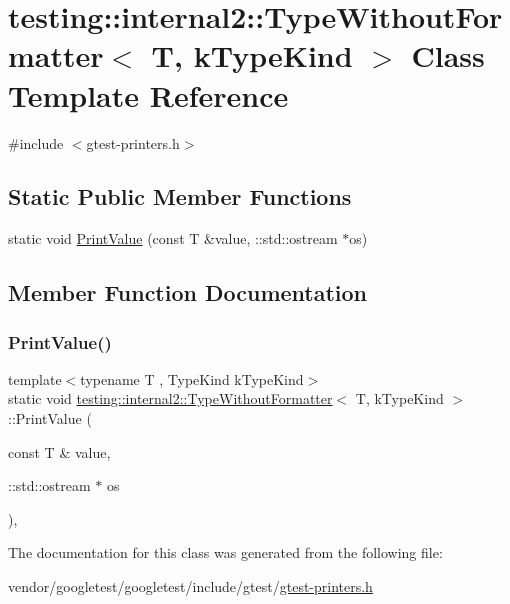 \hypertarget{classtesting_1_1internal2_1_1_type_without_formatter}{}\section{testing\+:\+:internal2\+:\+:Type\+Without\+Formatter$<$ T, k\+Type\+Kind $>$ Class Template Reference}
\label{classtesting_1_1internal2_1_1_type_without_formatter}


{\ttfamily \#include $<$gtest-\/printers.\+h$>$}

\subsection*{Static Public Member Functions}
\begin{DoxyCompactItemize}
\item 
static void \hyperlink{classtesting_1_1internal2_1_1_type_without_formatter_a6651f6f7be2c0f899729eeb6038f76d3}{Print\+Value} (const T \&value, \+::std\+::ostream $\ast$os)
\end{DoxyCompactItemize}


\subsection{Member Function Documentation}
\mbox{\label{classtesting_1_1internal2_1_1_type_without_formatter_a6651f6f7be2c0f899729eeb6038f76d3}} 
\subsubsection{\texorpdfstring{Print\+Value()}{PrintValue()}}
{\footnotesize\ttfamily template$<$typename T , Type\+Kind k\+Type\+Kind$>$ \\
static void \hyperlink{classtesting_1_1internal2_1_1_type_without_formatter}{testing\+::internal2\+::\+Type\+Without\+Formatter}$<$ T, k\+Type\+Kind $>$\+::Print\+Value (\begin{DoxyParamCaption}\item[{const T \&}]{value,  }\item[{\+::std\+::ostream $\ast$}]{os }\end{DoxyParamCaption})\hspace{0.3cm}{\ttfamily [inline]}, {\ttfamily [static]}}



The documentation for this class was generated from the following file\+:\begin{DoxyCompactItemize}
\item 
vendor/googletest/googletest/include/gtest/\hyperlink{gtest-printers_8h}{gtest-\/printers.\+h}\end{DoxyCompactItemize}
